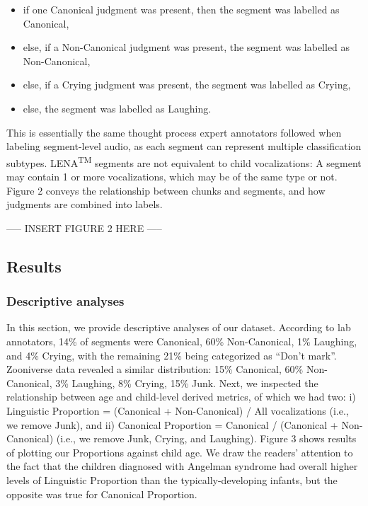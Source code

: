 \documentclass[english,,man]{apa6}
\providecommand{\tightlist}{%
  \setlength{\itemsep}{0pt}\setlength{\parskip}{0pt}}
\begin{document}
\begin{itemize}
\tightlist
\item
  if one Canonical judgment was present, then the segment was labelled as Canonical,
\item
  else, if a Non-Canonical judgment was present, the segment was labelled as Non-Canonical,
\item
  else, if a Crying judgment was present, the segment was labelled as Crying,
\item
  else, the segment was labelled as Laughing.
\end{itemize}

This is essentially the same thought process expert annotators followed when labeling segment-level audio, as each segment can represent multiple classification subtypes. LENA\textsuperscript{TM} segments are not equivalent to child vocalizations: A segment may contain 1 or more vocalizations, which may be of the same type or not. Figure 2 conveys the relationship between chunks and segments, and how judgments are combined into labels.

----- INSERT FIGURE 2 HERE -----

\hypertarget{results}{%
\subsection{Results}\label{results}}

\hypertarget{descriptive-analyses}{%
\subsubsection{Descriptive analyses}\label{descriptive-analyses}}

In this section, we provide descriptive analyses of our dataset. According to lab annotators, 14\% of segments were Canonical, 60\% Non-Canonical, 1\% Laughing, and 4\% Crying, with the remaining 21\% being categorized as \enquote{Don't mark}. Zooniverse data revealed a similar distribution: 15\% Canonical, 60\% Non-Canonical, 3\% Laughing, 8\% Crying, 15\% Junk.
Next, we inspected the relationship between age and child-level derived metrics, of which we had two: i) Linguistic Proportion = (Canonical + Non-Canonical) / All vocalizations (i.e., we remove Junk), and ii) Canonical Proportion = Canonical / (Canonical + Non-Canonical) (i.e., we remove Junk, Crying, and Laughing). Figure 3 shows results of plotting our Proportions against child age. We draw the readers' attention to the fact that the children diagnosed with Angelman syndrome had overall higher levels of Linguistic Proportion than the typically-developing infants, but the opposite was true for Canonical Proportion.
\end{document}
